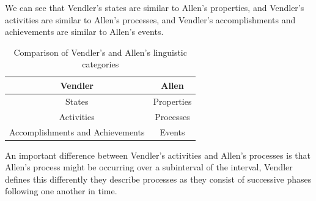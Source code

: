 We can see that Vendler's states are similar to Allen's properties, and Vendler's activities are similar to Allen's processes, and Vendler's accomplishments and achievements are similar to Allen's events.

\begin{table}[h]
\centering
\begin{tabular}{|c|c|}
\hline
\textbf{Vendler} & \textbf{Allen} \\
\hline
States & Properties \\
Activities & Processes \\
Accomplishments and Achievements & Events \\
\hline
\end{tabular}
\caption{Comparison of Vendler's and Allen's linguistic categories}
\label{tab:comparison}
\end{table}

An important difference between Vendler's activities and Allen's processes is that Allen's process might be occurring over a subinterval of the interval,
Vendler defines this differently they describe processes as they consist of successive phases following one another in time.


